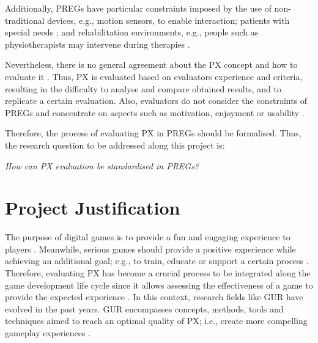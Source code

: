 Additionally, \acp{PREG} have particular constraints imposed by the use of non-traditional devices, e.g., motion sensors, to enable interaction; patients with special needs \autocite{Pirovano2016,Wiemeyer2015,Sinclair2007,Ni2014,Cameirao2010,Nijholt2008}; and rehabilitation environments, e.g., people such as physiotherapists may intervene during therapies \autocite{Wiemeyer2015,Nijholt2008}. 

Nevertheless, there is no general agreement about the \ac{PX} concept and how to evaluate it \autocite{Yanez-Gomez2017,Wiemeyer2016,Mueller2015}. Thus, \ac{PX} is evaluated based on evaluators experience and criteria, resulting in the difficulty to analyse and compare obtained results, and to replicate a certain evaluation. Also, evaluators do not consider the constraints of \acp{PREG} and concentrate on aspects such as motivation, enjoyment or usability \autocite{Brokaw2015,Ni2014,Cameirao2010,jansen2013serious}.

Therefore, the process of evaluating \ac{PX} in \acp{PREG} should be formalised. Thus, the research question to be addressed along this project is:

\begin{center} 
\emph{How can \ac{PX} evaluation be standardised in \acp{PREG}?}
\end{center} 


\section{Project Justification}\label{sec:problemJustfication}

The purpose of digital games is to provide a fun and engaging experience to players \autocite{Moosajee,Zammitto2014}. Meanwhile, serious games should provide a positive experience while achieving an additional goal; e.g., to train, educate or support a certain process \autocite{Wiemeyer2016}. Therefore, evaluating \ac{PX} has become a crucial process to be integrated along the game development life cycle since it allows assessing the effectiveness of a game to provide the expected experience \autocite{Bernhaupt2015,McAllister2015,desurvire_methods_2013,Nacke2009}. In this context, research fields like \ac{GUR} have evolved in the past years. \ac{GUR} encompasses concepts, methods, tools and techniques aimed to reach an optimal quality of \ac{PX}; i.e., create more compelling gameplay experiences \autocite{Moosajee,Nacke2015,Wiemeyer2016,Drachen2013}.

